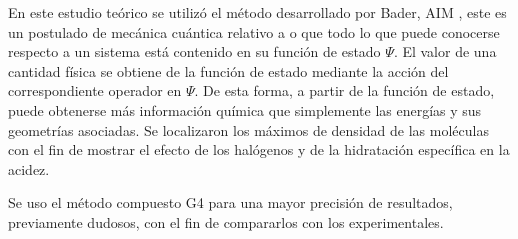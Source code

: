 En este estudio teórico se utilizó el método desarrollado por Bader, AIM \cite{quimica6}, este es un postulado de mecánica cuántica relativo a o que todo lo que puede conocerse respecto a un sistema está contenido en su función de estado $\Psi$. El valor de una cantidad física se obtiene de la función de estado mediante la acción del correspondiente operador en $\Psi$. De esta forma, a partir de la función de estado, puede obtenerse más información química que simplemente las energías y sus geometrías asociadas.
Se localizaron los máximos de densidad de las moléculas con el fin de mostrar el efecto de los halógenos y de la hidratación específica en la acidez.

Se uso el método compuesto G4 para una mayor precisión de resultados, previamente dudosos, con el fin de compararlos con los experimentales. \cite{quimica11}
 